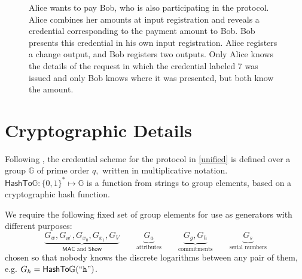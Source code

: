 \documentclass{article}
\begin{document}
\begin{figure}[h!]
  \centering
  \caption{Alice wants to pay Bob, who is also participating in the protocol. Alice combines her amounts at input registration and reveals a credential corresponding to the payment amount to Bob. Bob presents this credential in his own input registration. Alice registers a change output, and Bob registers two outputs. Only Alice knows the details of the request in which the credential labeled 7 was issued and only Bob knows where it was presented, but both know the amount.}
  \label{fig:ex4}
\end{figure}

\section{Cryptographic Details}\label{details}

Following \cite{chase2019signal}, the credential scheme for the protocol in \cref{unified} is defined over a group \(\mathbb{G}\) of prime order \(q,\) written in multiplicative notation.
$\mathsf{HashTo\mathbb{G}} : \{0,1\}^{*} \mapsto \mathbb{G}$ is a function from strings to group elements, based on a cryptographic hash function\cite{fouque2012indifferentiable}.

We require the following fixed set of group elements for use as generators with different purposes:
\[
\underbrace{G_{w}, G_{w^{\prime}}, G_{x_{0}}, G_{x_{1}}, G_{V}}_{\mathsf{MAC} \text{~and~} \mathsf{Show}}
\qquad
\underbrace{G_a}_{\text{attributes}}
\qquad
\underbrace{G_g, G_h}_{\text{commitments}}
\qquad
\underbrace{G_s}_{\text{serial numbers}}
\]
chosen so that nobody knows the discrete logarithms between any pair of them, e.g. $G_h = \mathsf{HashTo\mathbb{G}}(``\texttt{h}")$.
\end{document}
